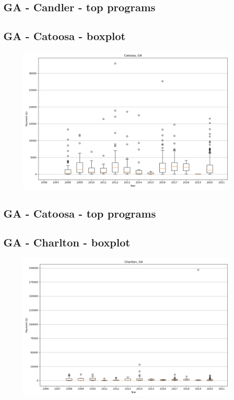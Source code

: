 \subsection*{GA - Candler - top programs}

\newpage
\subsection*{GA - Catoosa - boxplot}
\begin{figure}[h]
\centering
\includegraphics[width=7in]{../output/boxplots/counties/Catoosa-GA_boxplot.png}
\end{figure}


\subsection*{GA - Catoosa - top programs}

\newpage
\subsection*{GA - Charlton - boxplot}
\begin{figure}[h]
\centering
\includegraphics[width=7in]{../output/boxplots/counties/Charlton-GA_boxplot.png}
\end{figure}


